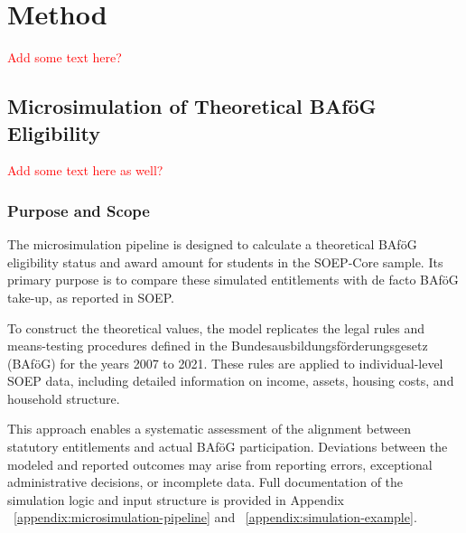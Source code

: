 %
%



\section{Method} 



\textcolor{red}{Add some text here?}

\subsection{Microsimulation of Theoretical BAföG Eligibility} 

\textcolor{red}{Add some text here as well?}

\subsubsection{Purpose and Scope}
The microsimulation pipeline is designed to calculate a theoretical BAföG eligibility status and award amount for students in the SOEP-Core sample. 
Its primary purpose is to compare these simulated entitlements with de facto BAföG take-up, as reported in SOEP.

To construct the theoretical values, the model replicates the legal rules and means-testing procedures defined in the Bundesausbildungsförderungsgesetz (BAföG) for the years 2007 to 2021. 
These rules are applied to individual-level SOEP data, including detailed information on income, assets, housing costs, and household structure.

This approach enables a systematic assessment of the alignment between statutory entitlements and actual BAföG participation. 
Deviations between the modeled and reported outcomes may arise from reporting errors, exceptional administrative decisions, or incomplete data. 
Full documentation of the simulation logic and input structure is provided in Appendix ~\ref{appendix:microsimulation-pipeline} and ~\ref{appendix:simulation-example}.

